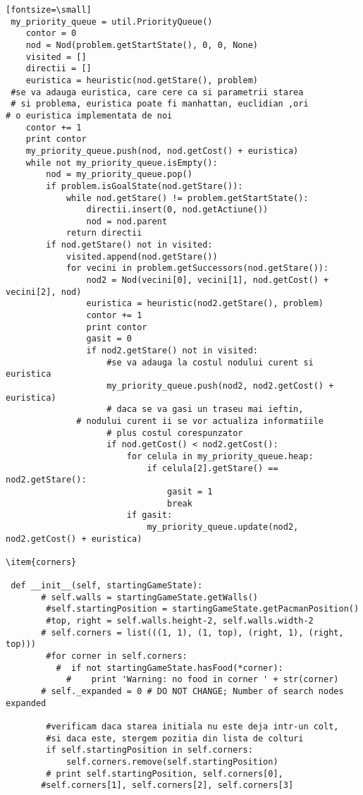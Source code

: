\begin{verbatim}[fontsize=\small]
 my_priority_queue = util.PriorityQueue()
    contor = 0
    nod = Nod(problem.getStartState(), 0, 0, None)
    visited = []
    directii = []
    euristica = heuristic(nod.getStare(), problem)
 #se va adauga euristica, care cere ca si parametrii starea
 # si problema, euristica poate fi manhattan, euclidian ,ori 
# o euristica implementata de noi
    contor += 1
    print contor
    my_priority_queue.push(nod, nod.getCost() + euristica)
    while not my_priority_queue.isEmpty():
        nod = my_priority_queue.pop()
        if problem.isGoalState(nod.getStare()):
            while nod.getStare() != problem.getStartState():
                directii.insert(0, nod.getActiune())
                nod = nod.parent
            return directii
        if nod.getStare() not in visited:
            visited.append(nod.getStare())
            for vecini in problem.getSuccessors(nod.getStare()):
                nod2 = Nod(vecini[0], vecini[1], nod.getCost() + vecini[2], nod)
                euristica = heuristic(nod2.getStare(), problem)
                contor += 1
                print contor
                gasit = 0
                if nod2.getStare() not in visited:
                    #se va adauga la costul nodului curent si euristica
                    my_priority_queue.push(nod2, nod2.getCost() + euristica)
                    # daca se va gasi un traseu mai ieftin,
	          # nodului curent ii se vor actualiza informatiile
                    # plus costul corespunzator
                    if nod.getCost() < nod2.getCost():
                        for celula in my_priority_queue.heap:
                            if celula[2].getStare() == nod2.getStare():
                                gasit = 1
                                break
                        if gasit:
                            my_priority_queue.update(nod2, nod2.getCost() + euristica)

\item{corners}

 def __init__(self, startingGameState):
       # self.walls = startingGameState.getWalls()
        #self.startingPosition = startingGameState.getPacmanPosition()
        #top, right = self.walls.height-2, self.walls.width-2
       # self.corners = list(((1, 1), (1, top), (right, 1), (right, top)))
        #for corner in self.corners:
          #  if not startingGameState.hasFood(*corner):
            #    print 'Warning: no food in corner ' + str(corner)
       # self._expanded = 0 # DO NOT CHANGE; Number of search nodes expanded

        #verificam daca starea initiala nu este deja intr-un colt,
        #si daca este, stergem pozitia din lista de colturi
        if self.startingPosition in self.corners:
            self.corners.remove(self.startingPosition)
        # print self.startingPosition, self.corners[0], 
       #self.corners[1], self.corners[2], self.corners[3]


\end{verbatim}
